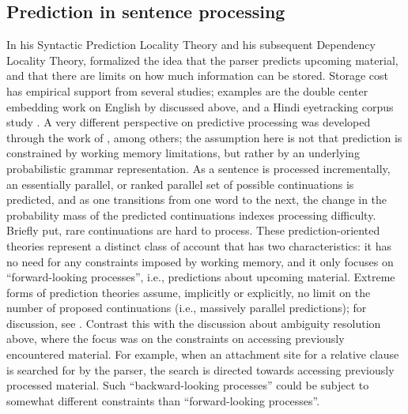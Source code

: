 \documentclass{cambridge7A}\usepackage[]{graphicx}\usepackage[]{color}
\begin{document}
\subsection{Prediction in sentence processing}

In his Syntactic Prediction Locality Theory \citep{Gibson1998} and his 
subsequent Dependency Locality Theory, \cite{Gibson2000} formalized
the idea that the parser predicts upcoming material, and that there
are limits on how much information can be stored. Storage
cost has empirical support from several studies; examples are the double
center embedding work on English by \cite{gibsonthomas97} discussed
above, and a Hindi eyetracking corpus study
\citep{HusainVasishthNarayanan2015}. A very different perspective on 
predictive processing was developed through the work of
\cite{Jurafsky1996,Hale2001,Levy2008}, among others; the assumption
here is not that prediction is constrained by working memory
limitations, but rather by an underlying probabilistic grammar 
representation. As a sentence is processed incrementally, an  
essentially parallel, or ranked parallel set of possible continuations 
is predicted, and as one transitions from one word to the next, the
change in the probability mass of the predicted continuations indexes
processing difficulty. Briefly put, rare continuations are hard to
process. These prediction-oriented theories represent a distinct class of
account that has two characteristics: it has no need for any
constraints imposed by working memory, and it only focuses on 
``forward-looking processes'', i.e., predictions about upcoming
material. Extreme forms of prediction theories assume, implicitly or explicitly, no limit on the number of proposed continuations (i.e., massively parallel predictions); for discussion, see \cite{BostonHaleVasishth2011}.
Contrast this with the discussion about ambiguity resolution
above, where the focus was on the constraints on accessing previously encountered material. For
example, when an attachment site for a relative clause is searched for 
by the parser, the search is directed towards accessing previously processed 
material. 
Such ``backward-looking processes'' could be subject to somewhat different constraints than ``forward-looking processes''.
\end{document}
